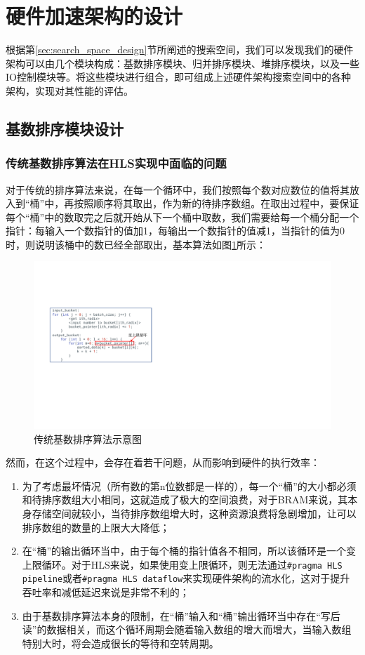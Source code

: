 \section{硬件加速架构的设计}

根据第\ref{sec:search_space_design}节所阐述的搜索空间，我们可以发现我们的硬件架构可以由几个模块构成：基数排序模块、归并排序模块、堆排序模块，以及一些IO控制模块等。将这些模块进行组合，即可组成上述硬件架构搜索空间中的各种架构，实现对其性能的评估。
\subsection{基数排序模块设计}
\subsubsection{传统基数排序算法在HLS实现中面临的问题}
对于传统的排序算法来说，在每一个循环中，我们按照每个数对应数位的值将其放入到“桶”中，再按照顺序将其取出，作为新的待排序数组。在取出过程中，要保证每个“桶”中的数取完之后就开始从下一个桶中取数，我们需要给每一个桶分配一个指针：每输入一个数指针的值加1，每输出一个数指针的值减1，当指针的值为0时，则说明该桶中的数已经全部取出，基本算法如图\ref{fig:traditional_radix_sort}所示：
\begin{figure}[htbp]
    \centering
    \includegraphics[width=12cm]{figures/traditional_radix_sort_algorithm.pdf}
    \caption{传统基数排序算法示意图}
    \label{fig:traditional_radix_sort}
\end{figure}

然而，在这个过程中，会存在着若干问题，从而影响到硬件的执行效率：
\begin{enumerate}
    \item 为了考虑最坏情况（所有数的第n位数都是一样的），每一个“桶”的大小都必须和待排序数组大小相同，这就造成了极大的空间浪费，对于BRAM来说，其本身存储空间就较小，当待排序数组增大时，这种资源浪费将急剧增加，让可以排序数组的数量的上限大大降低；
    \item 在“桶”的输出循环当中，由于每个桶的指针值各不相同，所以该循环是一个变上限循环。对于HLS来说，如果使用变上限循环，则无法通过\verb|#pragma HLS pipeline|或者\verb|#pragma HLS dataflow|来实现硬件架构的流水化，这对于提升吞吐率和减低延迟来说是非常不利的；
    \item 由于基数排序算法本身的限制，在“桶”输入和“桶”输出循环当中存在“写后读”的数据相关，而这个循环周期会随着输入数组的增大而增大，当输入数组特别大时，将会造成很长的等待和空转周期。
\end{enumerate}

